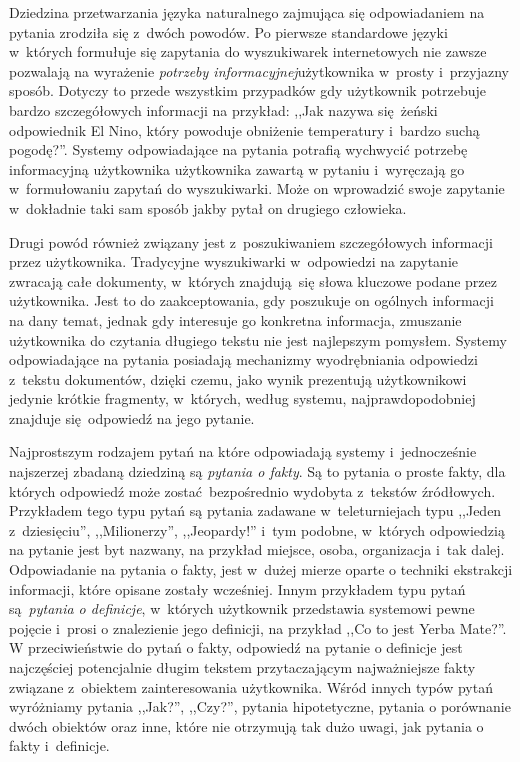 \documentclass[a4paper, twoside, openright, 12pt]{report}
\begin{document}
            Dziedzina przetwarzania języka naturalnego zajmująca się odpowiadaniem na pytania zrodziła się z~dwóch powodów.
            Po pierwsze standardowe języki w~których formułuje się zapytania do wyszukiwarek internetowych nie zawsze
            pozwalają na wyrażenie \emph{potrzeby informacyjnej}użytkownika w~prosty i~przyjazny sposób\cite{SEARCHENGINES}. Dotyczy to
            przede wszystkim przypadków gdy użytkownik potrzebuje bardzo szczegółowych informacji na przykład:
            ,,Jak nazywa się żeński odpowiednik El Nino, który powoduje obniżenie temperatury i~bardzo suchą pogodę?''.
            Systemy odpowiadające na pytania potrafią wychwycić potrzebę informacyjną użytkownika użytkownika zawartą w
            pytaniu i~wyręczają go w~formułowaniu zapytań do wyszukiwarki. Może on
            wprowadzić swoje zapytanie w~dokładnie taki sam sposób jakby pytał on drugiego człowieka.

            Drugi powód również związany jest z~poszukiwaniem szczegółowych informacji przez użytkownika. Tradycyjne
            wyszukiwarki w~odpowiedzi na zapytanie zwracają całe dokumenty, w~których znajdują się słowa kluczowe podane
            przez użytkownika. Jest to do zaakceptowania, gdy poszukuje on ogólnych informacji na dany temat, jednak
            gdy interesuje go konkretna informacja, zmuszanie użytkownika do czytania długiego tekstu nie jest najlepszym
            pomysłem. Systemy odpowiadające na pytania posiadają mechanizmy wyodrębniania odpowiedzi z~tekstu dokumentów,
            dzięki czemu, jako wynik prezentują użytkownikowi jedynie krótkie fragmenty, w~których, według systemu,
            najprawdopodobniej znajduje się odpowiedź na jego pytanie.

            Najprostszym rodzajem pytań na które odpowiadają
            systemy i~jednocześnie najszerzej zbadaną dziedziną są \emph{pytania o fakty}. Są to pytania o proste fakty,
            dla których odpowiedź może zostać bezpośrednio wydobyta z~tekstów źródłowych. Przykładem tego typu pytań są
            pytania zadawane w~teleturniejach typu ,,Jeden z~dziesięciu'', ,,Milionerzy'', ,,Jeopardy!'' i~tym podobne,
            w~których odpowiedzią na pytanie jest byt nazwany, na przykład miejsce, osoba, organizacja i~tak dalej.
            Odpowiadanie na pytania o fakty, jest w~dużej mierze oparte o techniki ekstrakcji informacji, które opisane
            zostały wcześniej.
            Innym przykładem typu pytań są \emph{pytania o definicje}, w~których użytkownik przedstawia systemowi pewne
            pojęcie i~prosi o znalezienie jego definicji, na przykład ,,Co to jest Yerba Mate?''. W przeciwieństwie do
            pytań o fakty, odpowiedź na pytanie o definicje jest najczęściej potencjalnie długim tekstem przytaczającym
            najważniejsze fakty związane z~obiektem zainteresowania użytkownika. Wśród innych typów
            pytań wyróżniamy pytania ,,Jak?'', ,,Czy?'', pytania hipotetyczne, pytania o porównanie dwóch obiektów oraz
            inne, które nie otrzymują tak dużo uwagi, jak pytania o fakty i~definicje.
\end{document}
